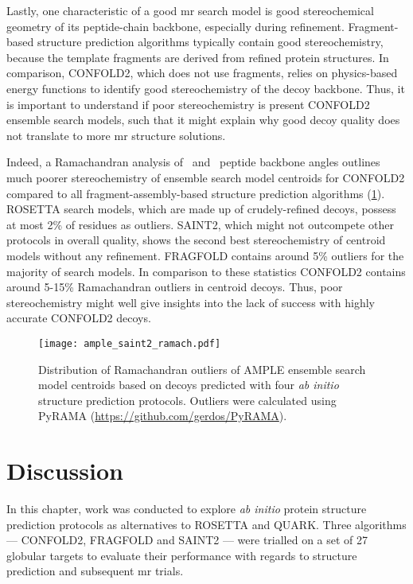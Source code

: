 Lastly, one characteristic of a good \gls{mr} search model is good stereochemical geometry of its peptide-chain backbone, especially during refinement. Fragment-based structure prediction algorithms typically contain good stereochemistry, because the template fragments are derived from refined protein structures. In comparison, CONFOLD2, which does not use fragments, relies on physics-based energy functions to identify good stereochemistry of the decoy backbone. Thus, it is important to understand if poor stereochemistry is present CONFOLD2 ensemble search models, such that it might explain why good decoy quality does not translate to more \gls{mr} structure solutions.

Indeed, a Ramachandran analysis of \textphi\ and \textpsi\ peptide backbone angles outlines much poorer stereochemistry of ensemble search model centroids for CONFOLD2 compared to all fragment-assembly-based structure prediction algorithms (\cref{fig:ample_saint2_ramach}). ROSETTA search models, which are made up of crudely-refined decoys, possess at most 2\% of residues as outliers. SAINT2, which might not outcompete other protocols in overall quality, shows the second best stereochemistry of centroid models without any refinement.  FRAGFOLD contains around 5\% outliers for the majority of search models. In comparison to these statistics CONFOLD2 contains around 5-15\% Ramachandran outliers in centroid decoys. Thus, poor stereochemistry might well give insights into the lack of success with highly accurate CONFOLD2 decoys.

\begin{figure}[H]
    \centering
    \texttt{[image: ample\_saint2\_ramach.pdf]}
    \caption[Distribution of Ramachandran outliers of AMPLE ensemble search model centroids]{Distribution of Ramachandran outliers of AMPLE ensemble search model centroids based on decoys predicted with four \textit{ab initio} structure prediction protocols. Outliers were calculated using PyRAMA (\href{https://github.com/gerdos/PyRAMA}{https://github.com/gerdos/PyRAMA}).}
    \label{fig:ample_saint2_ramach}
\end{figure}

\section{Discussion}
In this chapter, work was conducted to explore \textit{ab initio} protein structure prediction protocols as alternatives to ROSETTA and QUARK. Three algorithms --- CONFOLD2, FRAGFOLD and SAINT2 --- were trialled on a set of 27 globular targets to evaluate their performance with regards to structure prediction and subsequent \gls{mr} trials.

